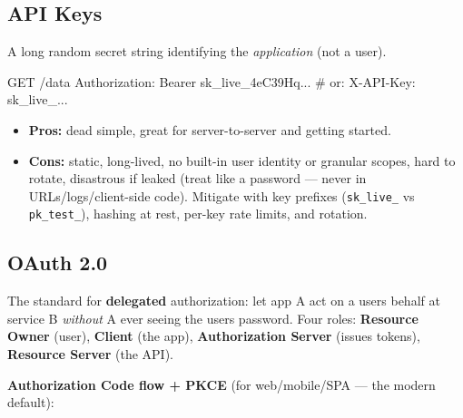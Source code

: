 \documentclass[11pt]{article}
\providecommand{\tightlist}{\setlength{\itemsep}{1pt}\setlength{\parskip}{0pt}}
\newenvironment{Shaded}{\begin{snugshade}}{\end{snugshade}}
\newcommand{\NormalTok}[1]{\textcolor[rgb]{0.81,0.81,0.76}{#1}}
\begin{document}
\subsection{API Keys}\label{api-keys}

A long random secret string identifying the \emph{application} (not a user).


\begin{Shaded}
\begin{Highlighting}[]
\NormalTok{GET /data}
\NormalTok{Authorization: Bearer sk\_live\_4eC39Hq...    \# or:  X{-}API{-}Key: sk\_live\_...}
\end{Highlighting}
\end{Shaded}

\begin{itemize}
\tightlist
\item
  \textbf{Pros:} dead simple, great for server-to-server and getting started.
\item
  \textbf{Cons:} static, long-lived, no built-in user identity or granular scopes, hard to rotate, disastrous if leaked (treat like a password --- never in URLs/logs/client-side code). Mitigate with key prefixes (\texttt{sk\_live\_} vs \texttt{pk\_test\_}), hashing at rest, per-key rate limits, and rotation.
\end{itemize}

\subsection{OAuth 2.0}\label{oauth-20}

The standard for \textbf{delegated} authorization: let app A act on a user\textquotesingle s behalf at service B \emph{without} A ever seeing the user\textquotesingle s password. Four roles: \textbf{Resource Owner} (user), \textbf{Client} (the app), \textbf{Authorization Server} (issues tokens), \textbf{Resource Server} (the API).

\textbf{Authorization Code flow + PKCE} (for web/mobile/SPA --- the modern default):

\setcodelang{}
\end{document}
